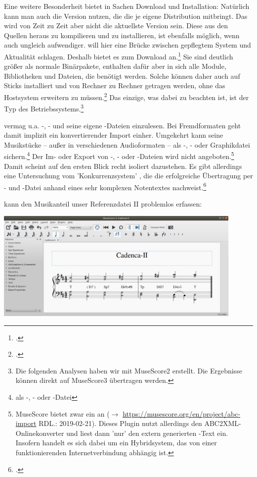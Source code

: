 Eine weitere Besonderheit bietet  in Sachen Download und
Installation: Natürlich kann man auch die Version nutzen, die die je eigene
Distribution mitbringt. Das wird von Zeit zu Zeit aber nicht die aktuellste
Version sein. Diese aus den Quellen heraus zu kompilieren und zu installieren,
ist ebenfalls möglich, wenn auch ungleich aufwendiger.  will hier
eine Brücke zwischen gepflegtem System und Aktualität schlagen. Deshalb bietet
es  zum Download an.\footcite[vgl.][\nopage wp]{MuseScore2019b}
Sie sind deutlich größer als normale Binärpakete, enthalten dafür aber in sich
alle Module, Bibliotheken und Dateien, die benötigt werden.
Solche  können daher auch auf Sticks installiert und von Rechner
zu Rechner getragen werden, ohne das Hostsystem erweitern zu
müssen.\footcite[vgl. dazu][\nopage wp]{Prakash2018a} Das einzige, was dabei zu
beachten ist, ist der Typ des Betriebssystems.\footnote{Die folgenden Analysen
haben wir mit MuseScore2 erstellt. Die Ergebnisse können direkt auf MuseScore3
übertragen werden.}

 vermag u.a. -, - und seine eigene
-Dateien einzulesen. Bei Fremdformaten geht damit implizit ein
konvertierender Import einher. Umgekehrt kann  seine Musikstücke
-- außer in verschiedenen Audioformaten -- als -, - oder
Graphikdatei sichern.\footnote{als -, - oder -Datei}
Der Im- oder Export von -, - oder -Dateien
wird nicht angeboten.\footnote{MuseScore bietet zwar ein 
an ($\rightarrow$ \href{https://musescore.org/en/project/abc-import}
{https://musescore.org/en/project/abc-import} RDL.: 2019-02-21). Dieses Plugin
nutzt allerdings den ABC2XML-Onlinekonverter und liest dann 'nur' den extern
generierten -Text ein. Insofern handelt es sich dabei um ein
Hybridsystem, das von einer funktionierenden Internetverbindung abhängig ist.}
Damit scheint  auf den ersten Blick recht isoliert dazustehen. Es
gibt allerdings eine Untersuchung vom 'Konkurrenzsystem' , die die
erfolgreiche Übertragung per - und -Datei anhand eines
sehr komplexen Notentextes nachweist.\footcite[vgl.][\nopage wp]{Denemo2019a}

 kann den Musikanteil unser Referenzdatei II problemlos erfassen:

\begin{center}
\includegraphics[width=0.9\textwidth]{frontends/musescore/cadenca2-musescore-300dpi.png}
\end{center}


